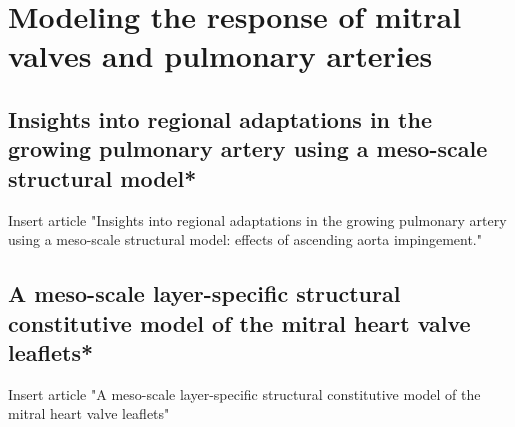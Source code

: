 \chapter{Modeling the response of mitral valves and pulmonary arteries}

\section{Insights into regional adaptations in the growing pulmonary artery using a meso-scale structural model*}

Insert article "Insights into regional adaptations in the growing pulmonary artery using a meso-scale structural model: effects of ascending aorta impingement."

\section{A meso-scale layer-specific structural constitutive model of the mitral heart valve leaflets*}

Insert article "A meso-scale layer-specific structural constitutive model of the mitral heart valve leaflets"

